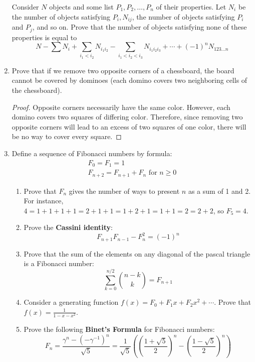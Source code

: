 \documentclass[../main.tex]{subfiles}
\begin{document}
\begin{enumerate}
    Consider $N$ objects and some list $P_1,P_2,\dots,P_n$ of their properties. Let $N_i$ be the number of objects satisfying $P_i,N_{ij}$, the number of objects satisfying $P_i$ and $P_j$, and so on. Prove that the number of objects satisfying none of these properties is equal to
    \begin{equation*}
        N-\sum N_i+\sum_{i_1<i_2}N_{i_1i_2}-\sum_{i_1<i_2<i_3}N_{i_1i_2i_3}+\cdots+(-1)^nN_{123\dots n}
    \end{equation*}
    \item Prove that if we remove two opposite corners of a chessboard, the board cannot be covered by dominoes (each domino covers two neighboring cells of the chessboard).
    \begin{proof}
        Opposite corners necessarily have the same color. However, each domino covers two squares of differing color. Therefore, since removing two opposite corners will lead to an excess of two squares of one color, there will be no way to cover every square.
    \end{proof}
    \item Define a sequence of Fibonacci numbers by formula:
    \begin{gather*}
        F_0 = F_1 = 1\\
        F_{n+2} = F_{n+1}+F_n\text{ for }n\geq 0
    \end{gather*}
    \begin{enumerate}
        \item Prove that $F_n$ gives the number of ways to present $n$ as a sum of 1 and 2. For instance, $4=1+1+1+1=2+1+1=1+2+1=1+1=2=2+2$, so $F_5=4$.
        \item Prove the \textbf{Cassini identity}:
        \begin{equation*}
            F_{n+1}F_{n-1}-F_n^2 = (-1)^n
        \end{equation*}
        \item Prove that the sum of the elements on any diagonal of the pascal triangle is a Fibonacci number:
        \begin{equation*}
            \sum_{k=0}^{n/2}\binom{n-k}{k} = F_{n+1}
        \end{equation*}
        \item Consider a generating function $f(x)=F_0+F_1x+F_2x^2+\cdots$. Prove that $f(x)=\frac{1}{1-x-x^2}$.
        \item Prove the following \textbf{Binet's Formula} for Fibonacci numbers:
        \begin{equation*}
            F_n = \frac{\gamma^n-(-\gamma^{-1})^n}{\sqrt{5}}
            = \frac{1}{\sqrt{5}}\left( \left( \frac{1+\sqrt{5}}{2} \right)^n-\left( \frac{1-\sqrt{5}}{2} \right)^n \right)
        \end{equation*}
    \end{enumerate}
\end{enumerate}
\end{document}
